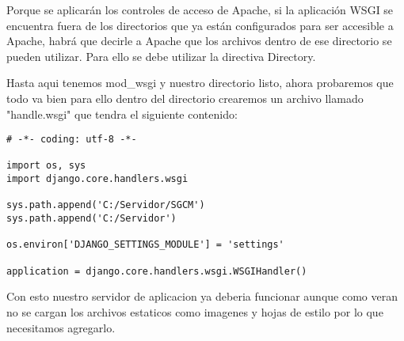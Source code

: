 Porque se aplicarán los controles de acceso de Apache, si la aplicación WSGI se
 encuentra fuera de los directorios que ya están configurados para ser accesible a
  Apache, habrá que decirle a Apache que los archivos dentro de ese directorio se
  pueden utilizar. Para ello se debe utilizar la directiva Directory.

Hasta aqui tenemos mod\_wsgi y nuestro directorio listo, ahora probaremos que
todo va bien para ello dentro del directorio crearemos un archivo llamado
"handle.wsgi" que tendra el siguiente contenido:

\begin{lstlisting}[style=Python]
# -*- coding: utf-8 -*-

import os, sys
import django.core.handlers.wsgi

sys.path.append('C:/Servidor/SGCM')
sys.path.append('C:/Servidor')

os.environ['DJANGO_SETTINGS_MODULE'] = 'settings'

application = django.core.handlers.wsgi.WSGIHandler()

\end{lstlisting}
\vspace{0.1cm}


Con esto nuestro servidor de aplicacion ya deberia funcionar aunque como veran
no se cargan los archivos estaticos como imagenes y hojas de estilo por lo
que necesitamos agregarlo.


